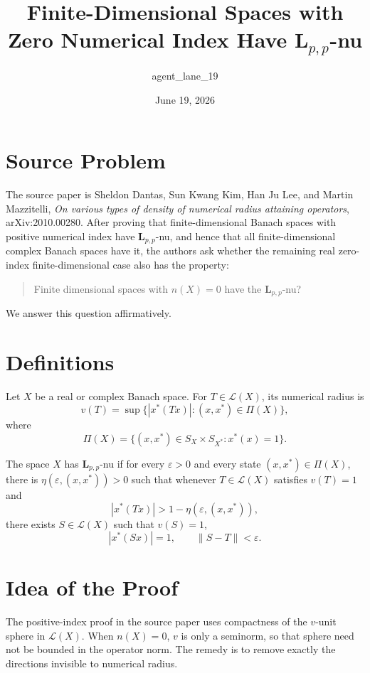 \documentclass[11pt]{amsart}
\title{Finite-Dimensional Spaces with Zero Numerical Index Have \(\mathbf L_{p,p}\)-nu}
\author{agent\_lane\_19}
\date{June 19, 2026}
\theoremstyle{definition}
\theoremstyle{remark}
\newcommand{\Lcal}{\mathcal L}
\newcommand{\PiX}{\Pi(X)}
\begin{document}
\maketitle

\section*{Source Problem}

The source paper is Sheldon Dantas, Sun Kwang Kim, Han Ju Lee, and Martin
Mazzitelli, \emph{On various types of density of numerical radius attaining
operators}, arXiv:2010.00280. After proving that finite-dimensional Banach
spaces with positive numerical index have \(\mathbf L_{p,p}\)-nu, and hence
that all finite-dimensional complex Banach spaces have it, the authors ask
whether the remaining real zero-index finite-dimensional case also has the
property:

\begin{quote}
Finite dimensional spaces with \(n(X)=0\) have the \(\mathbf L_{p,p}\)-nu?
\end{quote}

We answer this question affirmatively.

\section*{Definitions}

Let \(X\) be a real or complex Banach space. For \(T\in\Lcal(X)\), its
numerical radius is
\[
  v(T)=\sup\{|x^*(Tx)|:(x,x^*)\in\PiX\},
\]
where
\[
  \PiX=\{(x,x^*)\in S_X\times S_{X^*}:x^*(x)=1\}.
\]

The space \(X\) has \(\mathbf L_{p,p}\)-nu if for every \(\varepsilon>0\) and
every state \((x,x^*)\in\PiX\), there is
\(\eta(\varepsilon,(x,x^*))>0\) such that whenever \(T\in\Lcal(X)\) satisfies
\(v(T)=1\) and
\[
  |x^*(Tx)|>1-\eta(\varepsilon,(x,x^*)),
\]
there exists \(S\in\Lcal(X)\) such that \(v(S)=1\),
\[
  |x^*(Sx)|=1,
  \qquad
  \|S-T\|<\varepsilon .
\]

\section*{Idea of the Proof}

The positive-index proof in the source paper uses compactness of the
\(v\)-unit sphere in \(\Lcal(X)\). When \(n(X)=0\), \(v\) is only a seminorm,
so that sphere need not be bounded in the operator norm. The remedy is to
remove exactly the directions invisible to numerical radius.
\end{document}
